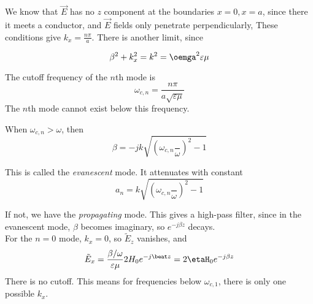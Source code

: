 \documentclass[12pt]{article}
\begin{document}
We know that $\vec E$ has no $z$ component at the boundaries $x=0,x=a$, since there it meets a conductor, and $\vec E$ fields only penetrate perpendicularly, These conditions give $k_x = \frac{n\pi}{a}$. There is another limit, since

$$\beta^2 + k_x^2 = k^2 = \oemga^2\varepsilon\mu$$

\begin{defn}
    The cutoff frequency of the $n$th mode is
    $$\omega_{c,n} = \frac{n\pi}{a\sqrt{\varepsilon\mu}}$$
    The $n$th mode cannot exist below this frequency.
\end{defn}

When $\omega_{c,n} > \omega$, then
$$\beta = -jk\sqrt{\left(\omega_{c,n}\frac{}{\omega}\right)^2 - 1}$$

This is called the \textit{evanescent} mode. It attenuates with constant
$$a_n = k\sqrt{\left(\omega_{c,n}\frac{}{\omega}\right)^2 - 1}$$

If not, we have the \textit{propagating} mode. This gives a high-pass filter, since in the evanescent mode, $\beta$ becomes imaginary, so $e^{-j\beta z}$ decays. \\

For the $n = 0$ mode, $k_x = 0$, so $\tilde E_z$ vanishes, and
$$\tilde E_x = \frac{\beta/\omega}{\varepsilon\mu} 2H_0e^{-j\beat z} = 2\etaH_0e^{-j\beta z}$$
There is no cutoff. This means for frequencies below $\omega_{c,1}$, there is only one possible $k_x$.
\end{document}

